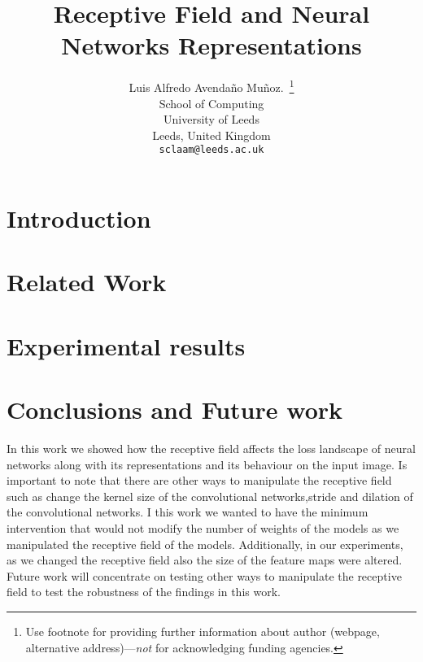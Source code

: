 \documentclass{article}
\title{Receptive Field and Neural Networks Representations}
\author{%
  Luis Alfredo Avendaño Muñoz.~\thanks{Use footnote for providing further information
    about author (webpage, alternative address)---\emph{not} for acknowledging
    funding agencies.} \\
  School of Computing\\
  University of Leeds\\
  Leeds, United Kingdom \\
  \texttt{sclaam@leeds.ac.uk} \\
}
\begin{document}
\maketitle


\begin{abstract}
\end{abstract}

\section{Introduction}


\section{Related Work}

\section{Experimental results}

\section{Conclusions and Future work}
\label{sec:conclusion}



 In this work we showed how the receptive field affects the loss landscape of neural networks along with its
 representations and its behaviour on the input image.
Is important to note that there are other ways to manipulate the receptive field such as change the kernel size of the
convolutional networks,stride and dilation of the convolutional networks. I this work we wanted to have the minimum
intervention that would not modify the number of weights of the models as we manipulated the receptive field of the
models. Additionally, in our experiments, as we changed the receptive field also the size of the feature maps were
altered. Future work will concentrate on testing other ways to manipulate the receptive field to test the robustness of
the findings in this work.



  
\end{document}
